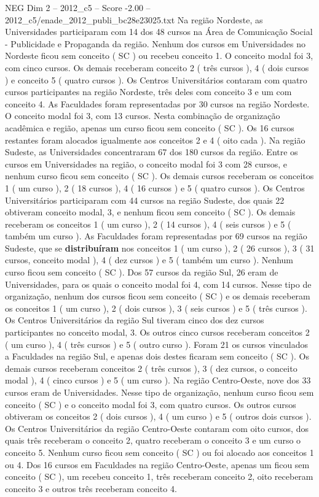 \begin{textsample}{NEG Dim 2 – 2012\_c5 – Score -2.00 – 2012\_c5/enade\_2012\_publi\_bc28e23025.txt}
Na região Nordeste, as Universidades participaram com 14 dos 48 cursos na Área de Comunicação Social - Publicidade e Propaganda da região.
Nenhum dos cursos em Universidades no Nordeste ficou sem conceito ( SC ) ou recebeu conceito 1.
O conceito modal foi 3, com cinco cursos.
Os demais receberam conceito 2 ( três cursos ), 4 ( dois cursos ) e conceito 5 ( quatro cursos ).
Os Centros Universitários contaram com quatro cursos participantes na região Nordeste, três deles com conceito 3 e um com conceito 4.
As Faculdades foram representadas por 30 cursos na região Nordeste.
O conceito modal foi 3, com 13 cursos.
Nesta combinação de organização acadêmica e região, apenas um curso ficou sem conceito ( SC ).
Os 16 cursos restantes foram alocados igualmente aos conceitos 2 e 4 ( oito cada ).
Na região Sudeste, as Universidades concentraram 67 dos 180 cursos da região.
Entre os cursos em Universidades na região, o conceito modal foi 3 com 28 cursos, e nenhum curso ficou sem conceito ( SC ).
Os demais cursos receberam os conceitos 1 ( um curso ), 2 ( 18 cursos ), 4 ( 16 cursos ) e 5 ( quatro cursos ).
Os Centros Universitários participaram com 44 cursos na região Sudeste, dos quais 22 obtiveram conceito modal, 3, e nenhum ficou sem conceito ( SC ).
Os demais receberam os conceitos 1 ( um curso ), 2 ( 14 cursos ), 4 ( seis cursos ) e 5 ( também um curso ).
As Faculdades foram representadas por 69 cursos na região Sudeste, que se \textbf{distribuíram} nos conceitos 1 ( um curso ), 2 ( 26 cursos ), 3 ( 31 cursos, conceito modal ), 4 ( dez cursos ) e 5 ( também um curso ).
Nenhum curso ficou sem conceito ( SC ).
Dos 57 cursos da região Sul, 26 eram de Universidades, para os quais o conceito modal foi 4, com 14 cursos.
Nesse tipo de organização, nenhum dos cursos ficou sem conceito ( SC ) e os demais receberam os conceitos 1 ( um curso ), 2 ( dois cursos ), 3 ( seis cursos ) e 5 ( três cursos ).
Os Centros Universitários da região Sul tiveram cinco dos dez cursos participantes no conceito modal, 3.
Os outros cinco cursos receberam conceitos 2 ( um curso ), 4 ( três cursos ) e 5 ( outro curso ).
Foram 21 os cursos vinculados a Faculdades na região Sul, e apenas dois destes ficaram sem conceito ( SC ).
Os demais cursos receberam conceitos 2 ( três cursos ), 3 ( dez cursos, o conceito modal ), 4 ( cinco cursos ) e 5 ( um curso ).
Na região Centro-Oeste, nove dos 33 cursos eram de Universidades.
Nesse tipo de organização, nenhum curso ficou sem conceito ( SC ) e o conceito modal foi 3, com quatro cursos.
Os outros cursos obtiveram os conceitos 2 ( dois cursos ), 4 ( um curso ) e 5 ( outros dois cursos ).
Os Centros Universitários da região Centro-Oeste contaram com oito cursos, dos quais três receberam o conceito 2, quatro receberam o conceito 3 e um curso o conceito 5.
Nenhum curso ficou sem conceito ( SC ) ou foi alocado aos conceitos 1 ou 4.
Dos 16 cursos em Faculdades na região Centro-Oeste, apenas um ficou sem conceito ( SC ), um recebeu conceito 1, três receberam conceito 2, oito receberam conceito 3 e outros três receberam conceito 4.

\end{textsample}
